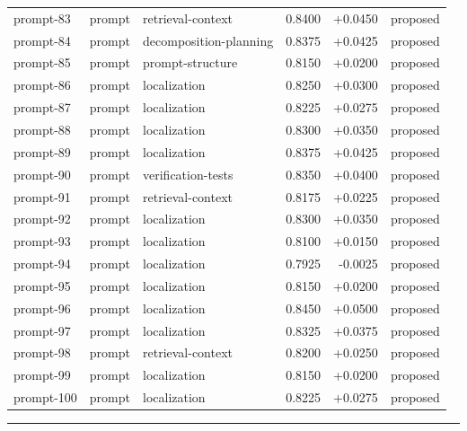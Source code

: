\begin{center}
\begin{longtable}{llp{5.2cm}rrl}
prompt-83 & prompt & retrieval-context & 0.8400 & +0.0450 & proposed \\
prompt-84 & prompt & decomposition-planning & 0.8375 & +0.0425 & proposed \\
prompt-85 & prompt & prompt-structure & 0.8150 & +0.0200 & proposed \\
prompt-86 & prompt & localization & 0.8250 & +0.0300 & proposed \\
prompt-87 & prompt & localization & 0.8225 & +0.0275 & proposed \\
prompt-88 & prompt & localization & 0.8300 & +0.0350 & proposed \\
prompt-89 & prompt & localization & 0.8375 & +0.0425 & proposed \\
prompt-90 & prompt & verification-tests & 0.8350 & +0.0400 & proposed \\
prompt-91 & prompt & retrieval-context & 0.8175 & +0.0225 & proposed \\
prompt-92 & prompt & localization & 0.8300 & +0.0350 & proposed \\
prompt-93 & prompt & localization & 0.8100 & +0.0150 & proposed \\
prompt-94 & prompt & localization & 0.7925 & -0.0025 & proposed \\
prompt-95 & prompt & localization & 0.8150 & +0.0200 & proposed \\
prompt-96 & prompt & localization & 0.8450 & +0.0500 & proposed \\
prompt-97 & prompt & localization & 0.8325 & +0.0375 & proposed \\
prompt-98 & prompt & retrieval-context & 0.8200 & +0.0250 & proposed \\
prompt-99 & prompt & localization & 0.8150 & +0.0200 & proposed \\
prompt-100 & prompt & localization & 0.8225 & +0.0275 & proposed \\
\bottomrule\end{longtable}\end{center}
\par\bigskip\hrule\bigskip
